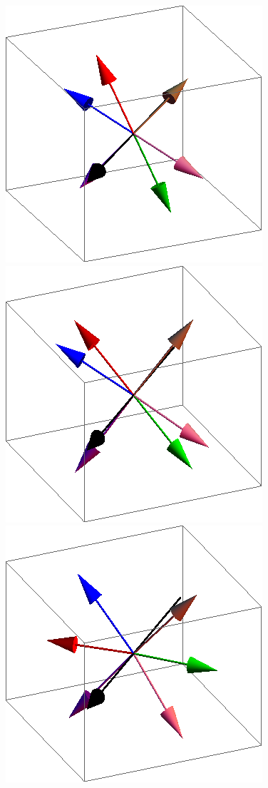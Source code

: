 \documentclass{article}
\begin{document}
\begin{figure}[ht]
\centering
\includegraphics[scale=0.27]{110/1S000to005R.png}
\includegraphics[scale=0.27]{110/69S000to005R.png}
\includegraphics[scale=0.27]{110/82S000to005R.png}

\end{figure}
\end{document}
